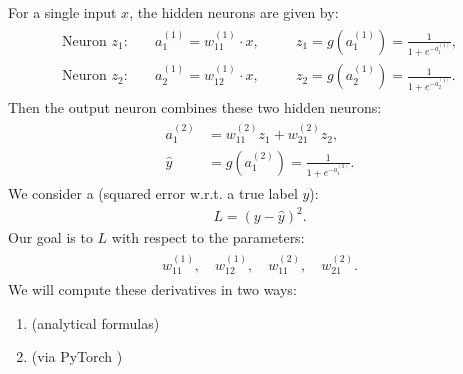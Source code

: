 \documentclass[letterpaper,10pt,english]{jupyterBook}
\begin{document}
\sphinxAtStartPar
For a single input \(x\), the hidden neurons are given by:
\begin{equation*}
\begin{split}\begin{aligned}
\text{Neuron } z_1: & \quad a_1^{(1)} = w_{11}^{(1)} \cdot x, && \quad z_1 = g(a_1^{(1)}) = \frac{1}{1 + e^{-a_1^{(1)}}}, \\
\text{Neuron } z_2: & \quad a_2^{(1)} = w_{12}^{(1)} \cdot x, && \quad z_2 = g(a_2^{(1)}) = \frac{1}{1 + e^{-a_2^{(1)}}}.
\end{aligned}
\end{split}
\end{equation*}
\sphinxAtStartPar
Then the output neuron combines these two hidden neurons:
\begin{equation*}
\begin{split}\begin{aligned}
a_1^{(2)} &= w_{11}^{(2)} z_1 + w_{21}^{(2)} z_2, \\
\hat{y} &= g(a_1^{(2)}) = \frac{1}{1 + e^{-a_1^{(2)}}}.
\end{aligned}
\end{split}
\end{equation*}
\sphinxAtStartPar
We consider a  (squared error w.r.t. a true label \(y\)):
\begin{equation*}
\begin{split}L = (y - \hat{y})^2.\end{split}
\end{equation*}
\sphinxAtStartPar
Our goal is to  \(L\) with respect to the parameters:
\begin{equation*}
\begin{split}\begin{aligned}
w_{11}^{(1)},\quad w_{12}^{(1)},\quad w_{11}^{(2)},\quad w_{21}^{(2)}.
\end{aligned}
\end{split}
\end{equation*}
\sphinxAtStartPar
We will compute these derivatives in two ways:
\begin{enumerate}
%
\item {} 
\sphinxAtStartPar
{} (analytical formulas)

\item {} 
\sphinxAtStartPar
{} (via PyTorch )

\end{enumerate}
\end{document}
